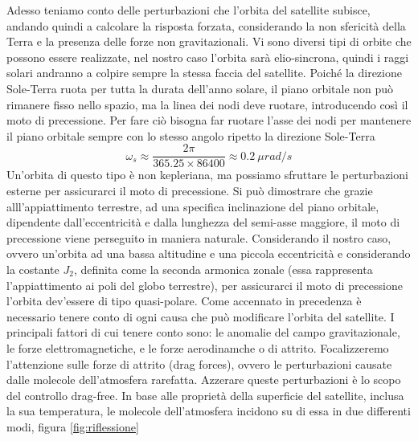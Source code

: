 Adesso teniamo conto delle perturbazioni che l'orbita del satellite subisce,
andando quindi a calcolare la risposta forzata, considerando la non sfericità
della Terra e la presenza delle forze non gravitazionali. Vi sono diversi tipi
di orbite che possono essere realizzate, nel nostro caso l'orbita sarà
elio-sincrona, quindi i raggi solari andranno a colpire sempre la stessa faccia
del satellite. Poiché la direzione Sole-Terra ruota per tutta la durata
dell'anno solare, il piano orbitale non può rimanere fisso nello spazio, ma la
linea dei nodi deve ruotare, introducendo così il moto di precessione. Per fare
ciò bisogna far ruotare l'asse dei nodi per mantenere il piano orbitale sempre
con lo stesso angolo ripetto la direzione Sole-Terra
\begin{equation}
\omega_s\approx \frac{2\pi}{365.25\times86400}\approx 0.2 \ \mu rad/s
\end{equation}
Un'orbita di questo tipo è non kepleriana, ma possiamo sfruttare le
perturbazioni esterne per assicurarci il moto di precessione. Si può dimostrare
che grazie alll'appiattimento terrestre, ad una specifica inclinazione del piano
orbitale, dipendente dall'eccentricità e dalla lunghezza del semi-asse maggiore,
il moto di precessione viene perseguito in maniera naturale. Considerando il
nostro caso, ovvero un'orbita ad una bassa altitudine e una piccola eccentricità
e considerando la costante $J_2$, definita come la seconda armonica zonale (essa
rappresenta l'appiattimento ai poli del globo terrestre), per assicurarci il
moto di precessione l'orbita dev'essere di tipo quasi-polare.
Come accennato in precedenza è necessario tenere conto di ogni causa che può
modificare l’orbita del satellite. I principali fattori di cui tenere conto
sono: le anomalie del campo gravitazionale, le forze elettromagnetiche, e le
forze aerodinamche o di attrito. Focalizzeremo l'attenzione sulle forze
di attrito (drag forces), ovvero le perturbazioni causate dalle molecole
dell'atmosfera rarefatta. Azzerare queste perturbazioni è lo scopo del controllo
drag-free.
In base alle proprietà della superficie del satellite, inclusa la sua
temperatura, le molecole dell'atmosfera incidono su di essa in due differenti
modi, figura \ref{fig:riflessione}
